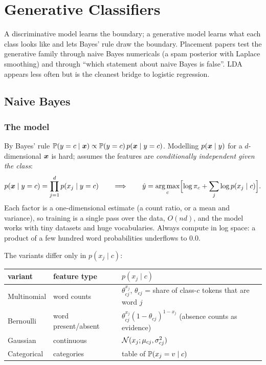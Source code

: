 \chapter{Generative Classifiers}
\label{ch:generative}
A discriminative model learns the boundary; a generative model learns what each class looks like
and lets Bayes' rule draw the boundary. Placement papers test the generative family through naive
Bayes numericals (a spam posterior with Laplace smoothing) and through ``which statement about
naive Bayes is false''. LDA appears less often but is the cleanest bridge to logistic regression.

\section{Naive Bayes}

\subsection{The model}
By Bayes' rule $\mathbb{P}(y=c\mid{\bm{x}})\propto\mathbb{P}(y=c)\,p({\bm{x}}\mid y=c)$. Modelling $p({\bm{x}}\mid y)$ for a
$d$-dimensional ${\bm{x}}$ is hard;  assumes the features are \emph{conditionally
	independent given the class}:
\[ p({\bm{x}}\mid y=c)=\prod_{j=1}^dp(x_j\mid y=c)
	\qquad\Longrightarrow\qquad
	\hat y=\operatorname*{arg\,max}_c\Bigl[\log\pi_c+\sum_j\log p(x_j\mid c)\Bigr]. \]
Each factor is a one-dimensional estimate (a count ratio, or a mean and variance), so training is a
single pass over the data, $O(nd)$, and the model works with tiny datasets and huge vocabularies.
Always compute in log space: a product of a few hundred word probabilities underflows to $0.0$.

The variants differ only in $p(x_j\mid c)$:
\begin{center}
	\small
	\begin{tabularx}{\linewidth}{l >{\raggedright\arraybackslash}X >{\raggedright\arraybackslash}X}
		\toprule
		variant & feature type & $p(x_j\mid c)$ \\ \midrule
		Multinomial & word counts & $\theta_{cj}^{x_j}$, $\theta_{cj}$ = share of class-$c$ tokens that are word $j$ \\
		Bernoulli & word present/absent & $\theta_{cj}^{x_j}(1-\theta_{cj})^{1-x_j}$ (absence counts as evidence) \\
		Gaussian & continuous & $\mathcal{N}(x_j;\mu_{cj},\sigma^2_{cj})$ \\
		Categorical & categories & table of $\mathbb{P}(x_j=v\mid c)$ \\
		\bottomrule
	\end{tabularx}
\end{center}

